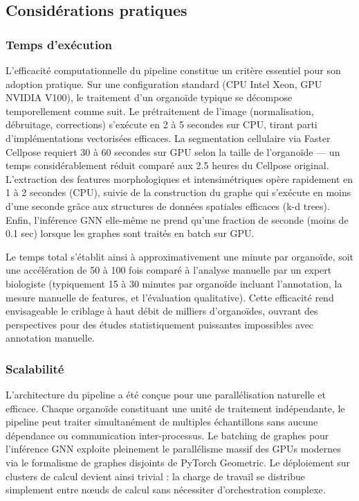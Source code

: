 \subsection{Considérations pratiques}

\subsubsection{Temps d'exécution}

L'efficacité computationnelle du pipeline constitue un critère essentiel pour son adoption pratique. Sur une configuration standard (CPU Intel Xeon, GPU NVIDIA V100), le traitement d'un organoïde typique se décompose temporellement comme suit. Le prétraitement de l'image (normalisation, débruitage, corrections) s'exécute en 2 à 5 secondes sur CPU, tirant parti d'implémentations vectorisées efficaces. La segmentation cellulaire via Faster Cellpose requiert 30 à 60 secondes sur GPU selon la taille de l'organoïde — un temps considérablement réduit comparé aux 2.5 heures du Cellpose original. L'extraction des features morphologiques et intensimétriques opère rapidement en 1 à 2 secondes (CPU), suivie de la construction du graphe qui s'exécute en moins d'une seconde grâce aux structures de données spatiales efficaces (k-d trees). Enfin, l'inférence GNN elle-même ne prend qu'une fraction de seconde (moins de 0.1 sec) lorsque les graphes sont traités en batch sur GPU.

Le temps total s'établit ainsi à approximativement une minute par organoïde, soit une accélération de 50 à 100 fois comparé à l'analyse manuelle par un expert biologiste (typiquement 15 à 30 minutes par organoïde incluant l'annotation, la mesure manuelle de features, et l'évaluation qualitative). Cette efficacité rend envisageable le criblage à haut débit de milliers d'organoïdes, ouvrant des perspectives pour des études statistiquement puissantes impossibles avec annotation manuelle.

\subsubsection{Scalabilité}

L'architecture du pipeline a été conçue pour une parallélisation naturelle et efficace. Chaque organoïde constituant une unité de traitement indépendante, le pipeline peut traiter simultanément de multiples échantillons sans aucune dépendance ou communication inter-processus. Le batching de graphes pour l'inférence GNN exploite pleinement le parallélisme massif des GPUs modernes via le formalisme de graphes disjoints de PyTorch Geometric. Le déploiement sur clusters de calcul devient ainsi trivial : la charge de travail se distribue simplement entre nœuds de calcul sans nécessiter d'orchestration complexe.

